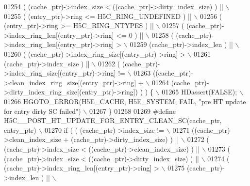 \begin{DoxyCode}
01254 \textcolor{preprocessor}{    ( (cache\_ptr)->index\_size < ((cache\_ptr)->dirty\_index\_size) ) ||          \(\backslash\)}
01255 \textcolor{preprocessor}{    ( (entry\_ptr)->ring <= H5C\_RING\_UNDEFINED ) ||                            \(\backslash\)}
01256 \textcolor{preprocessor}{    ( (entry\_ptr)->ring >= H5C\_RING\_NTYPES ) ||                               \(\backslash\)}
01257 \textcolor{preprocessor}{    ( (cache\_ptr)->index\_ring\_len[(entry\_ptr)->ring] <= 0 ) ||                \(\backslash\)}
01258 \textcolor{preprocessor}{    ( (cache\_ptr)->index\_ring\_len[(entry\_ptr)->ring] >                        \(\backslash\)}
01259 \textcolor{preprocessor}{      (cache\_ptr)->index\_len ) ||                                             \(\backslash\)}
01260 \textcolor{preprocessor}{    ( (cache\_ptr)->index\_ring\_size[(entry\_ptr)->ring] >                       \(\backslash\)}
01261 \textcolor{preprocessor}{      (cache\_ptr)->index\_size ) ||                                            \(\backslash\)}
01262 \textcolor{preprocessor}{    ( (cache\_ptr)->index\_ring\_size[(entry\_ptr)->ring] !=                      \(\backslash\)}
01263 \textcolor{preprocessor}{      ((cache\_ptr)->clean\_index\_ring\_size[(entry\_ptr)->ring] +                \(\backslash\)}
01264 \textcolor{preprocessor}{       (cache\_ptr)->dirty\_index\_ring\_size[(entry\_ptr)->ring]) ) ) \{           \(\backslash\)}
01265 \textcolor{preprocessor}{    HDassert(FALSE);                                                          \(\backslash\)}
01266 \textcolor{preprocessor}{    HGOTO\_ERROR(H5E\_CACHE, H5E\_SYSTEM, FAIL, "pre HT update for entry dirty SC failed") \(\backslash\)}
01267 \textcolor{preprocessor}{\}}
01268 
01269 \textcolor{preprocessor}{#define H5C\_\_POST\_HT\_UPDATE\_FOR\_ENTRY\_CLEAN\_SC(cache\_ptr, entry\_ptr)        \(\backslash\)}
01270 \textcolor{preprocessor}{if ( ( (cache\_ptr)->index\_size !=                                           \(\backslash\)}
01271 \textcolor{preprocessor}{       ((cache\_ptr)->clean\_index\_size + (cache\_ptr)->dirty\_index\_size) ) || \(\backslash\)}
01272 \textcolor{preprocessor}{     ( (cache\_ptr)->index\_size < ((cache\_ptr)->clean\_index\_size) ) ||       \(\backslash\)}
01273 \textcolor{preprocessor}{     ( (cache\_ptr)->index\_size < ((cache\_ptr)->dirty\_index\_size) ) ||       \(\backslash\)}
01274 \textcolor{preprocessor}{     ( (cache\_ptr)->index\_ring\_len[(entry\_ptr)->ring] >                     \(\backslash\)}
01275 \textcolor{preprocessor}{       (cache\_ptr)->index\_len ) ||                                          \(\backslash\)}

\end{DoxyCode}
